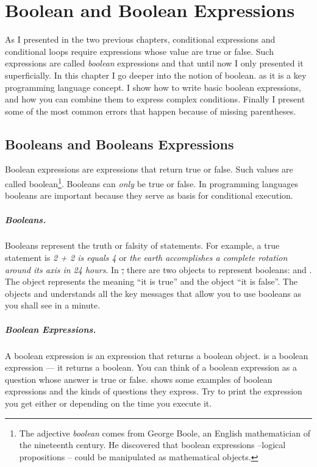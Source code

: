 \ifx\wholebook\relax\else



\fi


\chapter{Boolean and Boolean Expressions}\label{cha:boolean}

As I presented in the two previous chapters, conditional expressions and conditional loops require expressions whose value are true or false. Such expressions are called \emph{boolean} expressions and that until now I only presented it superficially. In this chapter I go deeper into the notion of boolean. as it is a key programming language concept. I show how to write basic boolean expressions, and how you can combine them to express complex conditions. Finally I present some of the most common errors that happen because of missing parentheses. 


\section{Booleans and Booleans Expressions}

Boolean expressions are expressions that return true or false. Such values are called boolean\footnote{The adjective \emph{boolean} comes from George Boole, an
English mathematician of the nineteenth century. He discovered that boolean expressions \---logical propositions \--- could be manipulated as mathematical objects.}. Booleans  can {\em only} be true or false. In programming languages booleans are important because they serve as basis for conditional execution.

\paragraph{Booleans.} Booleans  represent the truth or falsity of statements. For example, a true statement is  \textit{2 + 2 is equals 4} or \textit{the earth accomplishes a complete rotation around its axis in 24 hours}. In \st, there are two objects to represent booleans:  and . The object  represents the meaning ``it is true'' and the object  ``it is false''. The objects  and  understands all the key messages that allow you to use booleans as you shall see in a minute. 


\paragraph{Boolean Expressions.}
A boolean expression is an expression that returns a boolean object.  is a boolean expression --- it returns a boolean. You can think of a boolean expression as a question whose answer is true or false.  shows some examples of boolean expressions and the kinds of questions they express. Try to print the expression  you get either  or  depending on the time you execute it. 


